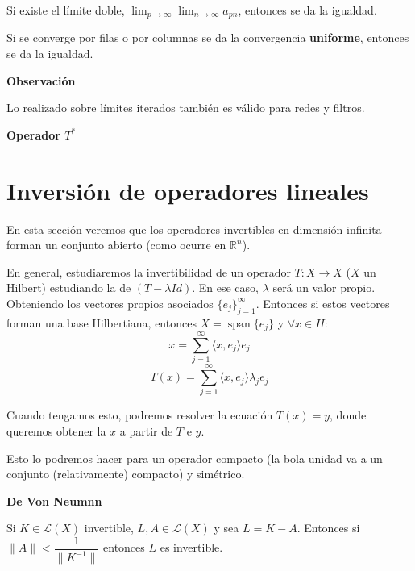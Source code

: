 \documentclass[openany]{book}
\begin{document}
\begin{proposition}
    Si existe el límite doble, $ \lim_{p \to \infty}\lim_{n \to \infty} a_{pn}$, entonces se da la igualdad.
\end{proposition}

\begin{theorem}
    Si se converge por filas o por columnas se da la convergencia \textbf{uniforme}, entonces se da la igualdad.
\end{theorem}


\begin{flushright}
    \textbf{Observación}
\end{flushright}

Lo realizado sobre límites iterados también es válido para redes y filtros.

\begin{definition}
    \textbf{Operador $ T^*$}

\end{definition}

\section{Inversión de operadores lineales}

En esta sección veremos que los operadores invertibles en dimensión infinita forman un conjunto abierto (como ocurre en $ \mathbb{R}^{n}$). 

En general, estudiaremos la invertibilidad de un operador $ T: X \to X$ ($ X$ un Hilbert) estudiando la de $ (T- \lambda  Id)$. En ese caso, $ \lambda $ será un valor propio. Obteniendo los vectores propios asociados $ \{e_j\}_{j=1}^{\infty}$. Entonces si estos vectores forman una base Hilbertiana, entonces $ X = \operatorname{span} \{e_j\}$ y $ \forall x \in H$:
$$ x = \sum\limits_{j=1}^{\infty} \langle x, e_j \rangle e_j  $$
$$ T(x) = \sum\limits_{j=1}^{ \infty} \langle x, e_j \rangle \lambda_j e_j $$

Cuando tengamos esto, podremos resolver la ecuación $ T(x) = y$, donde queremos obtener la $ x$ a partir de $ T $ e $ y$.

Esto lo podremos hacer para un operador compacto (la bola unidad va a un conjunto (relativamente) compacto) y simétrico.

\begin{theorem}
    \textbf{De Von Neumnn}

    Si $ K \in \mathcal{L}(X)$ invertible, $ L,A \in \mathcal{L}(X)$ y sea $ L = K - A$. Entonces si $ \|A\| < \dfrac{1}{\|K ^{-1}\|}$ entonces $ L$ es invertible.
\end{theorem}
\end{document}
